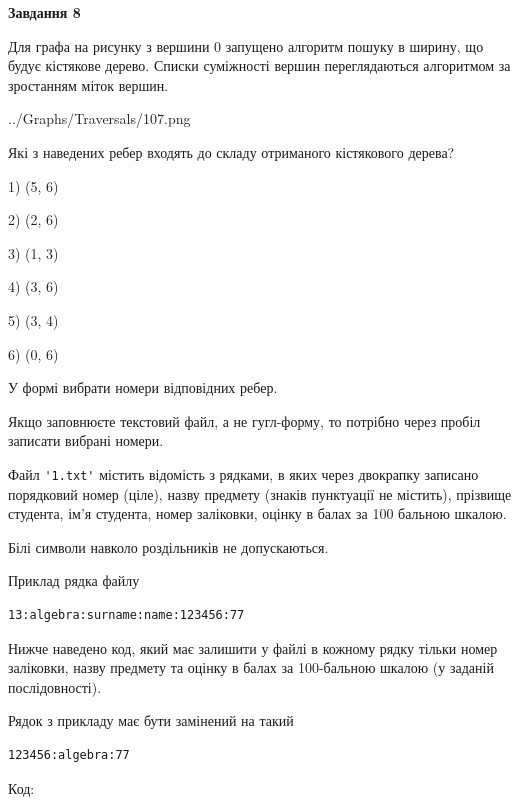 \documentclass[12pt, ukrainian]{article}
\def\code#1{\Verb!#1!}
\begin{document}
{\begin {large}
{\begin {center}\textbf{Завдання 8}\end {center}}\par
Для графа на рисунку з вершини 0 запущено алгоритм пошуку в ширину, що будує кістякове дерево. Списки суміжності вершин переглядаються алгоритмом за зростанням міток вершин.\par
\begin{center}
	{../Graphs/Traversals/107.png}
\end{center}
\par Які з наведених ребер входять до складу отриманого кістякового дерева?\par
1) (5, 6)\par
2) (2, 6)\par
3) (1, 3)\par
4) (3, 6)\par
5) (3, 4)\par
6) (0, 6)\par
{\vskip 15pt} У формі вибрати номери відповідних ребер.


Якщо заповнюєте текстовий файл, а не гугл-форму, то потрібно через пробіл записа\-ти вибрані номери.\par
\newpage


Файл \code{'1.txt'} містить відомість з рядками, в яких через двокрапку записа\-но поряд\-ковий номер (ціле), назву предмету (знаків пунктуації не містить), прізвище студента, ім'я студента, номер заліковки, оцінку в балах за 100 бальною шкалою.

Білі символи навколо роздільників не допускаються.

Приклад рядка файлу



\begin{verbatim}
13:algebra:surname:name:123456:77
\end{verbatim}


Нижче наведено код, який має залишити у файлі в кожному рядку тільки номер заліковки, назву предмету та оцінку в балах за 100-бальною шкалою (у заданій послі\-дов\-ності).

Рядок з прикладу має бути замінений на такий



\begin{verbatim}
123456:algebra:77
\end{verbatim}




Код:




\end{large}}
\end{document}
